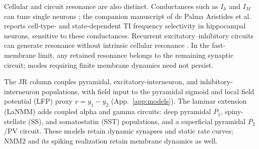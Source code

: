 \documentclass[11pt,a4paper]{article}
\begin{document}
Cellular and circuit resonance are also distinct. Conductances such as $I_h$ and
$I_M$ can tune single neurons \cite{hutcheonyarom2000}; the companion manuscript of
de Palma Aristides et al.\ \cite{depalma2026ti} reports cell-type- and state-dependent
TI frequency selectivity in hippocampal neurons, sensitive to these conductances.
Recurrent excitatory--inhibitory circuits can generate resonance without intrinsic
cellular resonance \cite{brunelhakim1999,brunelwang2003}. In the fast-membrane limit,
any retained resonance belongs to the remaining synaptic circuit; modes requiring
finite membrane dynamics need not persist.

The JR column couples pyramidal, excitatory-interneuron, and inhibitory-interneuron
populations, with field input to the pyramidal sigmoid and local field potential
(LFP) proxy $v=y_1-y_2$ (App.~\ref{app:models}). The laminar extension (LaNMM)
\cite{ruffini2025cfc,sanchezTodo2023} adds coupled alpha and gamma circuits: deep
pyramidal $P_1$, spiny-stellate (SS), and somatostatin (SST) populations, and a
superficial pyramidal $P_2$/PV circuit. These models retain dynamic synapses and
static rate curves; NMM2 and its spiking realization retain membrane dynamics as well.
\end{document}
